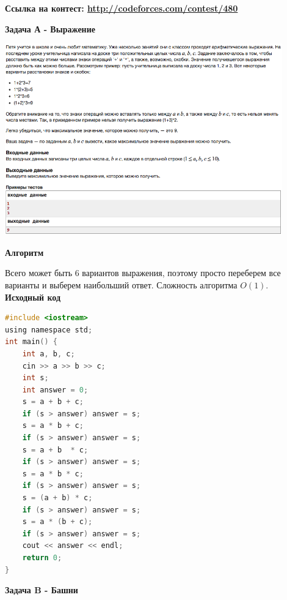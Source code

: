 \documentclass[a4paper,12pt]{article}
\begin{document}
\textbf{{\large Ссылка на контест: \url{http://codeforces.com/contest/480}}}

\newpage
\textbf{{\large Задача А - Выражение}}

\begin{center}
\includegraphics[width=0.9\textwidth]{C_274/C_274_A.png}\\ [1cm]
\end{center}

\textbf{{\large Алгоритм}}

Всего может быть 6 вариантов выражения, поэтому просто переберем все варианты и выберем наибольший ответ. Сложность алгоритма $O(1)$.\\

\textbf{{\large Исходный код}} \\
\begin{lstlisting}[language=C]
#include <iostream>
using namespace std;
int main() {
    int a, b, c;
    cin >> a >> b >> c;
    int s;
    int answer = 0;
    s = a + b + c;
    if (s > answer) answer = s;
    s = a * b + c;
    if (s > answer) answer = s;
    s = a + b  * c;
    if (s > answer) answer = s;
    s = a * b * c;
    if (s > answer) answer = s;
    s = (a + b) * c;
    if (s > answer) answer = s;
    s = a * (b + c);
    if (s > answer) answer = s;
    cout << answer << endl;
    return 0;
}
\end{lstlisting}

\newpage
\textbf{{\large Задача B - Башни}}
\end{document}
